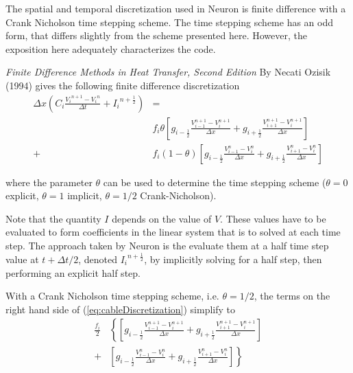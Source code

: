 \documentclass[11pt,a4paper]{article}
\newcommand{\eq}[1]{(\ref{#1})}
\newcommand{\dx}{{\Delta x}}
\newcommand{\dt}{{\Delta t}}
\newcommand{\at}[1]{{#1}_{i}}
\newcommand{\atplus}[1]{{#1}_{i+1}}
\newcommand{\atminus}[1]{{#1}_{i-1}}
\newcommand{\atplushalf}[1]{{#1}_{i+\frac{1}{2}}}
\newcommand{\atminushalf}[1]{{#1}_{i-\frac{1}{2}}}
\newcommand{\att}[1]{{#1}^{n}}
\newcommand{\attplus}[1]{{#1}^{n+1}}
\newcommand{\attplushalf}[1]{{#1}^{n+\frac{1}{2}}}
\begin{document}
The spatial and temporal discretization used in Neuron is finite difference with a Crank Nicholson time stepping scheme. The time stepping scheme has an odd form, that differs slightly from the scheme presented here. However, the exposition here adequately characterizes the code.

\emph{Finite Difference Methods in Heat Transfer, Second Edition} By Necati Ozisik (1994) gives the following finite difference discretization
\begin{align}
    \dx \left(\at{C} \frac{\attplus{\at{V}} - \att{\at{V}}}{\dt} + \attplushalf{\at{I}} \right)
    &=\nonumber \\
    & \at{f} \theta
            \left[
                \atminushalf{g} \frac{\atminus{V}^{n+1}-\at{V}^{n+1}}{\dx}
              + \atplushalf{g}  \frac{\atplus{V}^{n+1}-\at{V}^{n+1}}{\dx}
            \right] \nonumber \\
            + & \at{f} (1-\theta)
            \left[
                \atminushalf{g} \frac{\atminus{V}^{n}-\at{V}^{n}}{\dx}
              + \atplushalf{g}  \frac{\atplus{V}^{n}-\at{V}^{n}}{\dx}
            \right]
        \label{eq:cableDiscretization}
\end{align}

where the parameter $\theta$ can be used to determine the time stepping scheme ($\theta=0$ explicit, $\theta=1$ implicit, $\theta=1/2$ Crank-Nicholson).

Note that the quantity $I$ depends on the value of $V$. These values have to be evaluated to form coefficients in the linear system that is to solved at each time step. The approach taken by Neuron is the evaluate them at a half time step value at $t+\dt/2$, denoted $\attplushalf{\at{I}}$, by implicitly solving for a half step, then performing an explicit half step.

With a Crank Nicholson time stepping scheme, i.e. $\theta=1/2$, the terms on the right hand side of \eq{eq:cableDiscretization} simplify to
\begin{align}
        \frac{\at{f}}{2}
        &\left\{
            \left[
                \atminushalf{g} \frac{\atminus{V}^{n+1}-\at{V}^{n+1}}{\dx}
              + \atplushalf{g}  \frac{\atplus{V}^{n+1}-\at{V}^{n+1}}{\dx}
            \right]
        \right. \nonumber \\
        +
        &\left.
            \left[
                \atminushalf{g} \frac{\atminus{V}^{n}-\at{V}^{n}}{\dx}
              + \atplushalf{g}  \frac{\atplus{V}^{n}-\at{V}^{n}}{\dx}
            \right]
        \right\} \label{eq:crankNichRHS}
\end{align}
\end{document}
